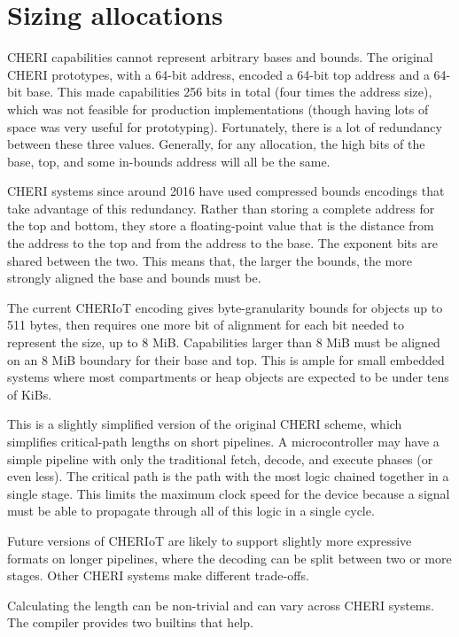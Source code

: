 {{{{{{{{\section{Sizing allocations}

CHERI capabilities cannot represent arbitrary bases and bounds.
The original CHERI prototypes, with a 64-bit address, encoded a 64-bit top address and a 64-bit base.
This made capabilities 256 bits in total (four times the address size), which was not feasible for production implementations (though having lots of space was very useful for prototyping).
Fortunately, there is a lot of redundancy between these three values.
Generally, for any allocation, the high bits of the base, top, and some in-bounds address will all be the same.

CHERI systems since around 2016 have used compressed bounds encodings that take advantage of this redundancy.
Rather than storing a complete address for the top and bottom, they store a floating-point value that is the distance from the address to the top and from the address to the base.
The exponent bits are shared between the two.
This means that, the larger the bounds, the more strongly aligned the base and bounds must be.

\begin{note}
The current CHERIoT encoding gives byte-granularity bounds for objects up to 511 bytes, then requires one more bit of alignment for each bit needed to represent the size, up to 8 MiB.
Capabilities larger than 8 MiB must be aligned on an 8 MiB boundary for their base and top.
This is ample for small embedded systems where most compartments or heap objects are expected to be under tens of KiBs.

This is a slightly simplified version of the original CHERI scheme, which simplifies critical-path lengths on short pipelines.
A microcontroller may have a simple pipeline with only the traditional fetch, decode, and execute phases (or even less).
The critical path is the path with the most logic chained together in a single stage.
This limits the maximum clock speed for the device because a signal must be able to propagate through all of this logic in a single cycle.

Future versions of CHERIoT are likely to support slightly more expressive formats on longer pipelines, where the decoding can be split between two or more stages.
Other CHERI systems make different trade-offs.
\end{note}


Calculating the length can be non-trivial and can vary across CHERI systems.
The compiler provides two builtins that help.

}}}}}}}}
